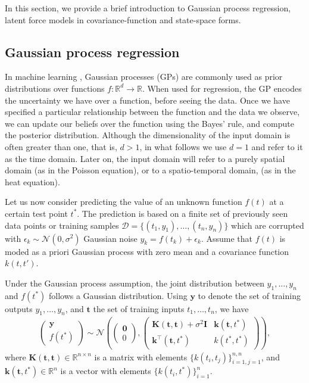 \documentclass[journal]{IEEEtran}
\begin{document}
In this section, we provide a brief introduction to Gaussian process regression, latent force models in covariance-function and state-space forms.


\subsection{Gaussian process regression}\label{sec:gp:regression}
%

In machine learning \cite{Rasmussen+Williams:2006}, Gaussian processes (GPs) are commonly used as prior distributions over functions $f: \mathbb{R}^d\rightarrow \mathbb{R}$. When used for regression, the GP encodes the uncertainty we have over a function, before seeing the data. Once we have specified a particular relationship between the function and the data we observe, we can update our beliefs over the function using the Bayes' rule, and compute the posterior distribution.  Although the dimensionality of the input domain is often greater than one, that is, $d>1$, in what follows we use $d=1$ and refer to it as the time domain. Later on, the input domain will refer to a purely spatial domain (as in the Poisson equation), or to a spatio-temporal domain, (as in the heat equation). 

Let us now consider predicting the value of an unknown function $f(t)$ at a certain test point $t^*$. The prediction is
based on a finite set of previously seen data points or training samples $\mathcal{D}=\{(t_1, y_1), \ldots, (t_n,
y_n)\}$ which are corrupted with $\epsilon_k \sim \mathcal{N}(0,\sigma^2)$ Gaussian noise $y_k = f(t_k) + \epsilon_k$. Assume that $f(t)$ is moded as a priori Gaussian process with zero mean and a covariance function $k(t,t')$.

Under the Gaussian process assumption, the joint distribution between $y_1, \ldots, y_n$ and $f(t^*)$ follows a Gaussian distribution. Using $\mathbf{y}$ to denote the set of training outputs $y_1, \ldots, y_n$, and $\mathbf{t}$ the set of training inputs $t_1, \ldots, t_n$, we have
\begin{align*}
\begin{pmatrix}
\mathbf{y}\\
f(t^*)
\end{pmatrix}\sim
\mathcal{N}
\left(
\begin{pmatrix}
\mathbf{0}\\
0
\end{pmatrix},
\begin{pmatrix}
\mathbf{K}(\mathbf{t}, \mathbf{t}) + \sigma^2 \mathbf{I} & \mathbf{k}(\mathbf{t}, t^*)\\
\mathbf{k}^{\top}(\mathbf{t}, t^*) & k(t^*, t^*)
\end{pmatrix}
\right),
\end{align*}
where $\mathbf{K}(\mathbf{t}, \mathbf{t})\in \mathbb{R}^{n\times n}$ is a matrix with elements
$\{k(t_i, t_j)\}_{i=1, j=1}^{n,n}$, and $\mathbf{k}(\mathbf{t}, t^*) \in \mathbb{R}^n$ is a vector with elements
$\{k(t_i, t^*)\}_{i=1}^n$.
\end{document}
